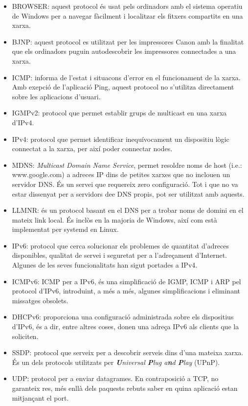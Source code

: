 \documentclass{article}
\begin{document}
\begin{itemize}
\item BROWSER: aquest protocol és usat pels ordinadors amb el sistema operatiu de 
Windows per a navegar fàcilment i localitzar els fitxers compartits en una xarxa.
\item BJNP: aquest protocol es utilitzat per les impressores Canon amb la finalitat
que els ordinadors puguin autodescobrir les impressores connectades a una xarxa.
\item ICMP: informa de l'estat i situacons d'error en el funcionament de la xarxa. Amb
exepció de l'aplicació Ping, aquest protocol no s'utilitza directament sobre les
aplicacions d'usuari.
\item IGMPv2: protocol que permet establir grups de multicast en una xarxa d'IPv4.
\item IPv4: protocol que permet identificar inequívocament un dispositiu lògic 
connectat a la xarxa, per així poder connectar nodes.
\item MDNS: \textit{Multicast Domain Name Service}, permet resoldre noms de host
(i.e.: www.google.com) a  adreces IP dins de petites xarxes que no inclouen 
un servidor DNS. És un servei que requereix zero configuració. Tot i que no va
estar dissenyat per a servidors dee DNS propis, pot ser utilitzat amb aquests.
\item LLMNR: és un protocol basant en el DNS per a trobar noms de domini en el mateix
link local. És inclòs en la majoria de Windows, així com està implementat per
systemd en Linux.
\item IPv6: protocol que cerca solucionar els problemes de quantitat d'adreces
disponibles, qualitat de servei i seguretat per a l'adreçament d'Internet. 
Algunes de les seves funcionalitats han sigut portades a IPv4.
\item ICMPv6: ICMP per a IPv6, és una simplificació de IGMP, ICMP i ARP pel protocol
d'IPv6, introduint, a més a més, algunes simplificacions i eliminant missatges obsolets.
\item DHCPv6: proporciona una configuració administrada sobre els dispositius d'IPv6,
és a dir, entre altres coses, donen una adreça IPv6 als clients que la soliciten.
\item SSDP: protocol que serveix per a descobrir serveis dins d'una mateixa xarxa.
És un dels protocols utilitzats per \textit{\textbf{U}niversal \textbf{P}lug 
a\textbf{n}d \textbf{P}lay} (UPnP).
\item UDP: protocol per a enviar datagrames. En contraposició a TCP, no garanteix res,
més enllà dels paquests rebuts saber en quina aplicació estan mitjançant el port.
\end{itemize}
\end{document}
